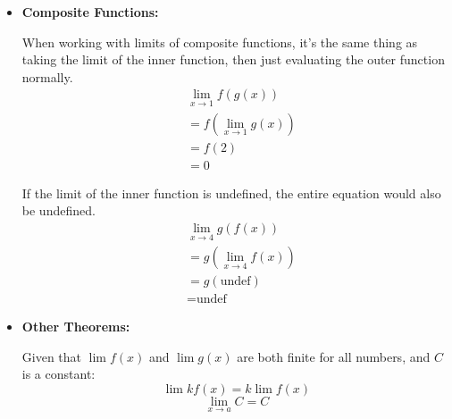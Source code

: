 \documentclass[12pt]{article}
\begin{document}
\begin{itemize}
                \item \textbf{Composite Functions:}

                    When working with limits of composite functions, it's the same thing as taking the limit of the inner function, then just evaluating the outer function normally.
                    \begin{align*}
                        &\lim_{x \to 1} f\left(g(x)\right) \\
                        &= f\left( \lim_{x \to 1} g(x) \right) \\
                        &= f(2) \\
                        &= 0
                    \end{align*}

                    If the limit of the inner function is undefined, the entire equation would also be undefined.
                    \begin{align*}
                        &\lim_{x \to 4} g\left( f(x) \right) \\
                        &= g\left( \lim_{x \to 4} f(x) \right) \\
                        &= g(\text{undef}) \\
                        &= \text{undef}
                    \end{align*}
                    \smallskip

                \item \textbf{Other Theorems:}

                    Given that $\lim f(x)$ and $\lim g(x)$ are both finite for all numbers, and $C$ is a constant:
                    \[ \lim k f(x) = k \lim f(x) \]
                    \[ \lim_{x \to a} C = C \]
                    \smallskip
            \end{itemize}

            \begin{figure}[H]
                \begin{center}
                    \caption[Figure 2]{}
                    \label{fig:limproperties}
                \end{center}
            \end{figure}
\end{document}

